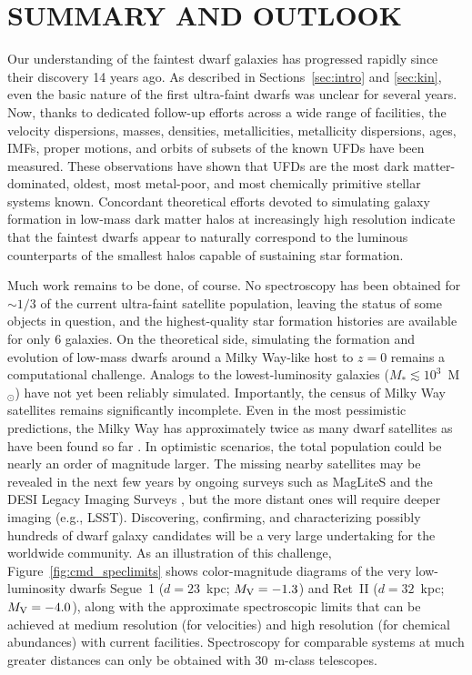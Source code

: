 \documentclass[a4paper]{ar-1col}
\newcommand{\msun}        {M$_{\odot}$}
\begin{document}
\section{SUMMARY AND OUTLOOK}
\label{sec:summary}

Our understanding of the faintest dwarf galaxies has progressed
rapidly since their discovery 14 years ago.  As described in
Sections~\ref{sec:intro} and \ref{sec:kin}, even the basic nature of
the first ultra-faint dwarfs was unclear for several years.  Now,
thanks to dedicated follow-up efforts across a wide range of
facilities, the velocity dispersions, masses, densities,
metallicities, metallicity dispersions, ages, IMFs, proper motions,
and orbits of subsets of the known UFDs have been measured.  These
observations have shown that UFDs are the most dark matter-dominated,
oldest, most metal-poor, and most chemically primitive stellar systems
known.  Concordant theoretical efforts devoted to simulating galaxy
formation in low-mass dark matter halos at increasingly high
resolution indicate that the faintest dwarfs appear to naturally
correspond to the luminous counterparts of the smallest halos capable
of sustaining star formation.

Much work remains to be done, of course.  No spectroscopy has been
obtained for $\sim1/3$ of the current ultra-faint satellite
population, leaving the status of some objects in question, and the
highest-quality star formation histories are available for only 6
galaxies.  On the theoretical side, simulating the formation and
evolution of low-mass dwarfs around a Milky Way-like host to $z=0$
remains a computational challenge.  Analogs to the lowest-luminosity
galaxies ($M_{*} \lesssim 10^{3}$~\msun) have not yet been reliably
simulated.  Importantly, the census of Milky Way satellites remains
significantly incomplete.  Even in the most pessimistic predictions,
the Milky Way has approximately twice as many dwarf satellites as have
been found so far \citep[e.g.,][]{newton18}.  In optimistic scenarios,
the total population could be nearly an order of magnitude larger.
The missing nearby satellites may be revealed in the next few years by
ongoing surveys such as MagLiteS \citep{dw16} and the DESI Legacy
Imaging Surveys \citep{dey18}, but the more distant ones will require
deeper imaging (e.g., LSST).  Discovering, confirming, and
characterizing possibly hundreds of dwarf galaxy candidates will be a
very large undertaking for the worldwide community.  As an
illustration of this challenge, Figure~\ref{fig:cmd_speclimits} shows
color-magnitude diagrams of the very low-luminosity dwarfs Segue~1 ($d
= 23$~kpc; $M_{{\rm V}} = -1.3$) and Ret~II ($d = 32$~kpc; $M_{{\rm
    V}} = -4.0$), along with the approximate spectroscopic limits that
can be achieved at medium resolution (for velocities) and high
resolution (for chemical abundances) with current facilities.
Spectroscopy for comparable systems at much greater distances can only
be obtained with 30~m-class telescopes.
\end{document}
